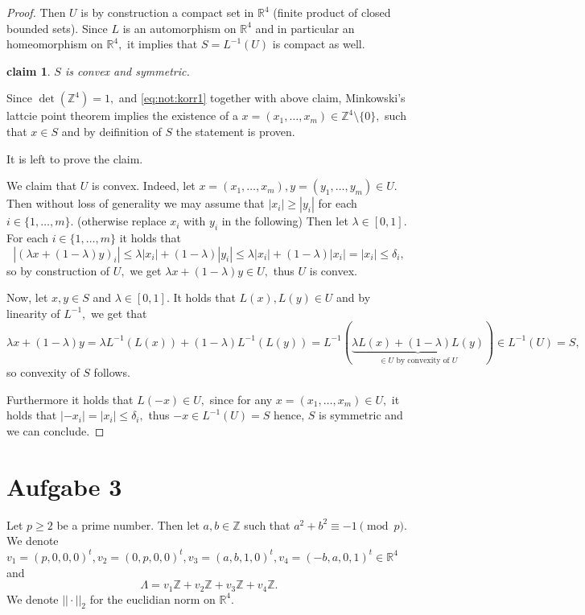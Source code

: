 \documentclass[10pt,a4paper]{article}
\newtheorem*{claim*}{claim}
\newcommand{\RR}{\mathbb{R}}
\newcommand{\ZZ}{\mathbb{Z}}
\begin{document}
\begin{proof}
		Then $U$ is by construction a compact set in $\RR^4$ (finite product of closed bounded sets). Since $L$ is an automorphism on $\RR^4$ and in particular an homeomorphism on $\RR^4,$ it implies that $S = L^{-1}(U)$ is compact as well.
		\begin{claim*}
			$S$ is convex and symmetric.
		\end{claim*}
		Since $\det(\ZZ^4) = 1,$ and \eqref{eq:not:korr1} together with above claim, Minkowski's lattcie point theorem implies the existence of a $x=(x_1,\dots, x_m)\in \ZZ^4\setminus\{0\},$ such that $x\in S$ and by deifinition of $S$ the statement is proven. \vspace{0.2cm}
		
		It is left to prove the claim.
		
		We claim that $U$ is convex. Indeed, let $x = (x_1, \dots, x_m),y = (y_1,\dots, y_m)\in U.$ Then without loss of generality we may assume that $|x_i|\geq |y_i|$ for each $i\in \{1, \dots, m\}.$ (otherwise replace $x_i$ with $y_i$ in the following) Then let $\lambda\in [0,1].$ For each $i\in \{1,\dots, m\}$ it holds that
		\[|(\lambda x + (1-\lambda)y)_i| \leq \lambda |x_i| + (1-\lambda) |y_i| \leq \lambda |x_i| + (1-\lambda) |x_i| = |x_i|\leq \delta_i,\]
		so by construction of $U,$ we get $\lambda x + (1-\lambda)y\in U,$ thus $U$ is convex.  
		
		Now, let $x,y \in S$ and $\lambda\in [0,1].$ It holds that $L(x), L(y)\in U$ and by linearity of $L^{-1},$ we get that
		\[\lambda x+ (1-\lambda) y = \lambda L^{-1}(L(x)) + (1-\lambda)L^{-1}(L(y)) = L^{-1}(\underbrace{\lambda L(x) + (1-\lambda) L(y)}_{\in U\text{ by convexity of } U}) \in L^{-1}(U) = S,\]
		so convexity of $S$ follows.
		
		Furthermore it holds that $L(-x)\in U,$ since for any $x = (x_1,\dots, x_m)\in U,$ it holds that $|-x_i| = |x_i| \leq \delta_i,$ thus $-x\in L^{-1}(U) = S$ hence, $S$ is symmetric and we can conclude.
	\end{proof}
	\pagebreak
	
	\section*{Aufgabe 3}
	Let $p\geq 2$ be a prime number. Then let $a, b \in \ZZ$ such that $a^2+ b^2 \equiv -1 \pmod{p}.$ We denote
	$v_1 = (p,0,0,0)^t, v_2 = (0,p, 0, 0)^t, v_3 = (a,b,1,0)^t, v_4 = (-b,a,0,1)^t\in \RR^4$ and 
	\[\Lambda = v_1\ZZ + v_2\ZZ + v_3\ZZ + v_4\ZZ.\]
	We denote $||\cdot ||_2$ for the euclidian norm on $\RR^4.$
	
\end{document}

